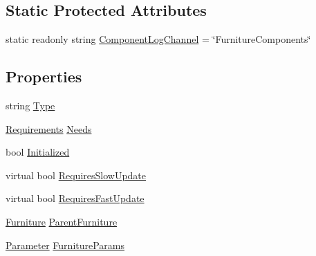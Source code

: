 \subsection*{Static Protected Attributes}
\begin{DoxyCompactItemize}
\item 
static readonly string \hyperlink{class_project_porcupine_1_1_buildable_1_1_components_1_1_buildable_component_ac77147a18cd2db90f7e2bb57e01692c8}{Component\+Log\+Channel} = \char`\"{}Furniture\+Components\char`\"{}
\end{DoxyCompactItemize}
\subsection*{Properties}
\begin{DoxyCompactItemize}
\item 
string \hyperlink{class_project_porcupine_1_1_buildable_1_1_components_1_1_buildable_component_aec1e1b6a229897af73da04a445618d25}{Type}
\item 
\hyperlink{class_project_porcupine_1_1_buildable_1_1_components_1_1_buildable_component_a331a0d67512b8b402c04c8cf31c0ca8a}{Requirements} \hyperlink{class_project_porcupine_1_1_buildable_1_1_components_1_1_buildable_component_a73972c1361c2a4d7c9d98d8ce8a40eb9}{Needs}
\item 
bool \hyperlink{class_project_porcupine_1_1_buildable_1_1_components_1_1_buildable_component_abcd05389f01af31312cda28ae1b75277}{Initialized}
\item 
virtual bool \hyperlink{class_project_porcupine_1_1_buildable_1_1_components_1_1_buildable_component_af79ccbafac141e8529483e24d6c8dae5}{Requires\+Slow\+Update}
\item 
virtual bool \hyperlink{class_project_porcupine_1_1_buildable_1_1_components_1_1_buildable_component_aabb6474ee977d19235ef17345a2c8c8e}{Requires\+Fast\+Update}
\item 
\hyperlink{class_furniture}{Furniture} \hyperlink{class_project_porcupine_1_1_buildable_1_1_components_1_1_buildable_component_a563746a8a8cce0cf2c2024b9f3387027}{Parent\+Furniture}
\item 
\hyperlink{class_parameter}{Parameter} \hyperlink{class_project_porcupine_1_1_buildable_1_1_components_1_1_buildable_component_acea58f772d2b256a594113769fff664e}{Furniture\+Params}
\end{DoxyCompactItemize}


